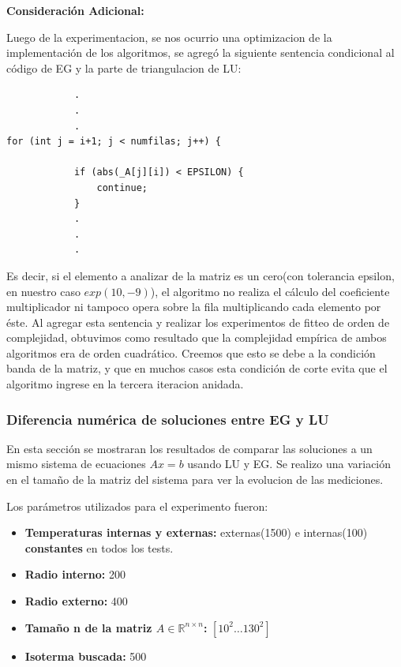 \textbf{Consideraci\'on Adicional:} 

Luego de la experimentacion, se nos ocurrio una optimizacion de la implementaci\'on de los algoritmos, se agreg\'o la siguiente sentencia condicional al código de EG y la parte de triangulacion de LU:

\begin{lstlisting}
			.
			.
			.
for (int j = i+1; j < numfilas; j++) {

            if (abs(_A[j][i]) < EPSILON) {
                continue;
            }
			.
			.
			.
\end{lstlisting}

Es decir, si el elemento a analizar de la matriz es un cero(con tolerancia epsilon, en nuestro caso $exp(10, -9)$), el algoritmo no realiza el c\'alculo del coeficiente multiplicador ni tampoco opera sobre la fila multiplicando cada elemento por \'este. Al agregar esta sentencia y realizar los experimentos de fitteo de orden de complejidad, obtuvimos como resultado que la complejidad emp\'irica de ambos algoritmos era de orden cuadr\'atico. Creemos que esto se debe a la condición banda de la matriz, y que en muchos casos esta condición de corte evita que el algoritmo ingrese en la tercera iteracion anidada.

\subsubsection{Diferencia numérica de soluciones entre EG y LU}
En esta sección se mostraran los resultados de comparar las soluciones a un mismo sistema de ecuaciones $Ax=b$ usando LU y EG. Se realizo una variación en el tamaño de la matriz del sistema para ver la evolucion de las mediciones.\\

\vspace{0.3cm}

Los parámetros utilizados para el experimento fueron:
\begin{itemize}
	\item \textbf{Temperaturas internas y externas:}  externas(1500) e internas(100) \textbf{constantes} en todos los tests. 
	\item \textbf{Radio interno:} 200
	\item \textbf{Radio externo:} 400
	\item \textbf{Tamaño n de la matriz $A \in \mathbb{R}^{n \times n}$:} $[10^2\dots130^2]$
	\item \textbf{Isoterma buscada:} 500
\end{itemize}


